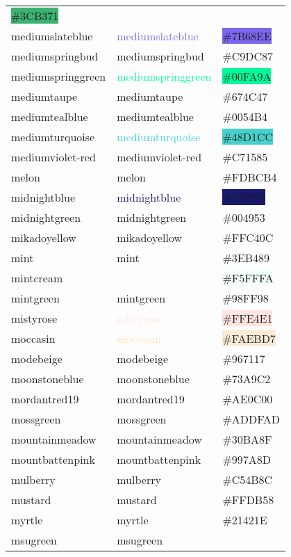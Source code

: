 \documentclass[
]{article}
\begin{document}
\begin{longtable}[]{@{}lll@{}}
\colorbox{mediumseagreen}{\#3CB371}\tabularnewline
mediumslateblue & \textcolor{mediumslateblue}{mediumslateblue} &
\colorbox{mediumslateblue}{\#7B68EE}\tabularnewline
mediumspringbud & \textcolor{mediumspringbud}{mediumspringbud} &
\colorbox{mediumspringbud}{\#C9DC87}\tabularnewline
mediumspringgreen & \textcolor{mediumspringgreen}{mediumspringgreen} &
\colorbox{mediumspringgreen}{\#00FA9A}\tabularnewline
mediumtaupe & \textcolor{mediumtaupe}{mediumtaupe} &
\colorbox{mediumtaupe}{\#674C47}\tabularnewline
mediumtealblue & \textcolor{mediumtealblue}{mediumtealblue} &
\colorbox{mediumtealblue}{\#0054B4}\tabularnewline
mediumturquoise & \textcolor{mediumturquoise}{mediumturquoise} &
\colorbox{mediumturquoise}{\#48D1CC}\tabularnewline
mediumviolet-red & \textcolor{mediumviolet-red}{mediumviolet-red} &
\colorbox{mediumviolet-red}{\#C71585}\tabularnewline
melon & \textcolor{melon}{melon} &
\colorbox{melon}{\#FDBCB4}\tabularnewline
midnightblue & \textcolor{midnightblue}{midnightblue} &
\colorbox{midnightblue}{\#191970}\tabularnewline
midnightgreen & \textcolor{midnightgreen}{midnightgreen} &
\colorbox{midnightgreen}{\#004953}\tabularnewline
mikadoyellow & \textcolor{mikadoyellow}{mikadoyellow} &
\colorbox{mikadoyellow}{\#FFC40C}\tabularnewline
mint & \textcolor{mint}{mint} & \colorbox{mint}{\#3EB489}\tabularnewline
mintcream & \textcolor{mintcream}{mintcream} &
\colorbox{mintcream}{\#F5FFFA}\tabularnewline
mintgreen & \textcolor{mintgreen}{mintgreen} &
\colorbox{mintgreen}{\#98FF98}\tabularnewline
mistyrose & \textcolor{mistyrose}{mistyrose} &
\colorbox{mistyrose}{\#FFE4E1}\tabularnewline
moccasin & \textcolor{moccasin}{moccasin} &
\colorbox{antiquewhite}{\#FAEBD7}\tabularnewline
modebeige & \textcolor{modebeige}{modebeige} &
\colorbox{drab}{\#967117}\tabularnewline
moonstoneblue & \textcolor{moonstoneblue}{moonstoneblue} &
\colorbox{moonstoneblue}{\#73A9C2}\tabularnewline
mordantred19 & \textcolor{mordantred19}{mordantred19} &
\colorbox{mordantred19}{\#AE0C00}\tabularnewline
mossgreen & \textcolor{mossgreen}{mossgreen} &
\colorbox{mossgreen}{\#ADDFAD}\tabularnewline
mountainmeadow & \textcolor{mountainmeadow}{mountainmeadow} &
\colorbox{mountainmeadow}{\#30BA8F}\tabularnewline
mountbattenpink & \textcolor{mountbattenpink}{mountbattenpink} &
\colorbox{mountbattenpink}{\#997A8D}\tabularnewline
mulberry & \textcolor{mulberry}{mulberry} &
\colorbox{mulberry}{\#C54B8C}\tabularnewline
mustard & \textcolor{mustard}{mustard} &
\colorbox{mustard}{\#FFDB58}\tabularnewline
myrtle & \textcolor{myrtle}{myrtle} &
\colorbox{myrtle}{\#21421E}\tabularnewline
msugreen & \textcolor{msugreen}{msugreen} &

\end{longtable}
\end{document}
